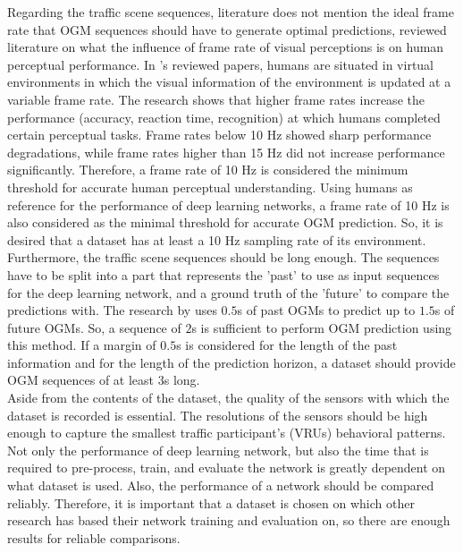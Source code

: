 Regarding the traffic scene sequences, literature does not mention the ideal frame rate that \gls{OGM} sequences should have to generate optimal predictions, \cite{chen2007review} reviewed literature on what the influence of frame rate of visual perceptions is on human perceptual performance. In \cite{chen2007review}'s reviewed papers, humans are situated in virtual environments in which the visual information of the environment is updated at a variable frame rate. The research shows that higher frame rates increase the performance (accuracy, reaction time, recognition) at which humans completed certain perceptual tasks. Frame rates below 10 Hz showed sharp performance degradations, while frame rates higher than 15 Hz did not increase performance significantly. Therefore, a frame rate of 10 Hz is considered the minimum threshold for accurate human perceptual understanding. Using humans as reference for the performance of deep learning networks, a frame rate of 10 Hz is also considered as the minimal threshold for accurate \gls{OGM} prediction. So, it is desired that a dataset has at least a 10 Hz sampling rate of its environment. Furthermore, the traffic scene sequences should be long enough. The sequences have to be split into a part that represents the 'past' to use as input sequences for the deep learning network, and a ground truth of the 'future' to compare the predictions with. The research by \cite{lange2020attention} uses $0.5$s of past \glspl{OGM} to predict up to $1.5$s of future \glspl{OGM}. So, a sequence of $2$s is sufficient to perform \gls{OGM} prediction using this method. If a margin of $0.5$s is considered for the length of the past information and for the length of the prediction horizon, a dataset should provide \gls{OGM} sequences of at least $3$s long. \\

Aside from the contents of the dataset, the quality of the sensors with which the dataset is recorded is essential. The resolutions of the sensors should be high enough to capture the smallest traffic participant's (\glspl{VRU}) behavioral patterns. Not only the performance of deep learning network, but also the time that is required to pre-process, train, and evaluate the network is greatly dependent on what dataset is used. Also, the performance of a network should be compared reliably. Therefore, it is important that a dataset is chosen on which other research has based their network training and evaluation on, so there are enough results for reliable comparisons. \\

